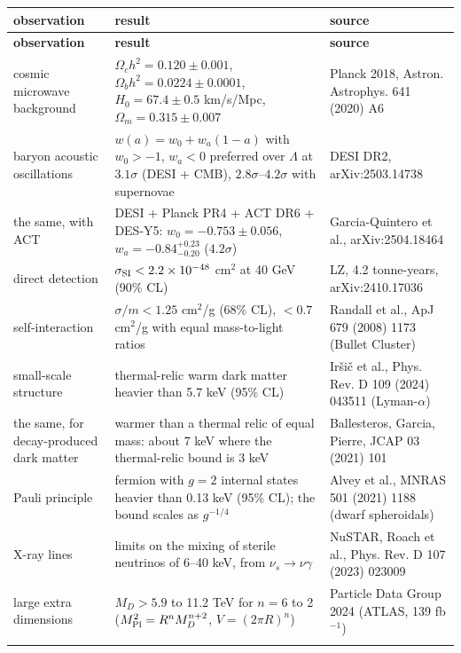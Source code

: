 \documentclass[10pt,a4paper]{article}
\begin{document}
{\footnotesize
\begin{longtable}{>{\raggedright\arraybackslash}p{}>{\raggedright\arraybackslash}p{}>{\raggedright\arraybackslash}p{}}
\toprule
\textbf{observation} & \textbf{result} & \textbf{source} \\
\midrule\endfirsthead
\toprule
\textbf{observation} & \textbf{result} & \textbf{source} \\
\midrule\endhead
\endfoot
\bottomrule\endlastfoot
cosmic microwave background & $\Omega_ch^2=0.120\pm0.001$, $\Omega_bh^2=0.0224\pm0.0001$, $H_0=67.4\pm0.5$ km/s/Mpc, $\Omega_m=0.315\pm0.007$ & Planck 2018, Astron. Astrophys. 641 (2020) A6 \\
baryon acoustic oscillations & $w(a)=w_0+w_a(1-a)$ with $w_0>-1$, $w_a<0$ preferred over $\Lambda$ at $3.1\sigma$ (DESI + CMB), $2.8\sigma$–$4.2\sigma$ with supernovae & DESI DR2, arXiv:2503.14738 \\
the same, with ACT & DESI + Planck PR4 + ACT DR6 + DES-Y5: $w_0=-0.753\pm0.056$, $w_a=-0.84^{+0.23}_{-0.20}$ ($4.2\sigma$) & Garcia-Quintero et al., arXiv:2504.18464 \\
direct detection & $\sigma_{\rm SI}<2.2\times10^{-48}$ cm$^2$ at 40 GeV (90\% CL) & LZ, 4.2 tonne-years, arXiv:2410.17036 \\
self-interaction & $\sigma/m<1.25$ cm$^2$/g (68\% CL), $<0.7$ cm$^2$/g with equal mass-to-light ratios & Randall et al., ApJ 679 (2008) 1173 (Bullet Cluster) \\
small-scale structure & thermal-relic warm dark matter heavier than 5.7 keV (95\% CL) & Iršič et al., Phys. Rev. D 109 (2024) 043511 (Lyman-$\alpha$) \\
the same, for decay-produced dark matter & warmer than a thermal relic of equal mass: about 7 keV where the thermal-relic bound is 3 keV & Ballesteros, Garcia, Pierre, JCAP 03 (2021) 101 \\
Pauli principle & fermion with $g=2$ internal states heavier than 0.13 keV (95\% CL); the bound scales as $g^{-1/4}$ & Alvey et al., MNRAS 501 (2021) 1188 (dwarf spheroidals) \\
X-ray lines & limits on the mixing of sterile neutrinos of 6–40 keV, from $\nu_s\to\nu\gamma$ & NuSTAR, Roach et al., Phys. Rev. D 107 (2023) 023009 \\
large extra dimensions & $M_D>5.9$ to 11.2 TeV for $n=6$ to 2 ($M_{\rm Pl}^2=R^nM_D^{n+2}$, $V=(2\pi R)^n$) & Particle Data Group 2024 (ATLAS, 139 fb$^{-1}$) \\*
\end{longtable}}
\end{document}

